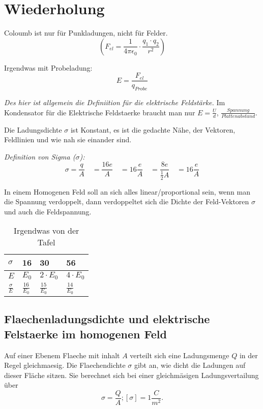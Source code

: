 \documentclass[a4paper]{report}
\begin{document}
\section{Wiederholung}

Coloumb ist nur f\"ur Punkladungen, nicht f\"ur Felder.
\[\left(F_{el}=\frac{1}{4\pi\epsilon_0}\cdot \frac{q_1\cdot q_2}{r^2}\right)\]

Irgendwas mit Probeladung: \[E=\frac{F_{el}}{q_{Probe}}\]

\textit{Des hier ist allgemein die Definiition f\"ur die elektrische Feldst\"arke.}
Im Kondensator f\"ur die Elektrische Feldstaerke braucht man nur
$E=\frac{U}{d}$, $\frac{Spannung}{Plattenabstand}$.


Die Ladungsdichte $\sigma$ ist Konstant, es ist die gedachte N\"ahe, der
Vektoren, Feldlinien und wie nah sie einander sind.

\textit{Definition von Sigma ($\sigma$):}
\[\sigma=\frac{q}{A} \quad =\frac{16e}{A} \quad = 16 \frac{e}{A} \quad = \frac{8e}{\frac{1}{2}A} \quad = 16 \frac{e}{A}\]

In einem Homogenen Feld soll an sich alles linear/proportional sein, wenn man
die Spannung verdoppelt, dann verdoppeltet sich die Dichte der Feld-Vektoren
$\sigma$ und auch die Feldspannung.

\begin{table}
  \caption{Irgendwas von der Tafel}
  \begin{center}
    \begin{tabular}[c]{l|l|l|l}
      \hline
      $\sigma$ & 16 & 30 & 56 \\
      \hline
      $E$ & $E_0$ & $2\cdot E_0$ & $4\cdot E_0$\\
      \hline
      $\frac{\sigma}{E}$ & $\frac{16}{E_0}$ & $\frac{15}{E_0}$ & $\frac{14}{E_0}$\\
    \end{tabular}
  \end{center}
\end{table}

\subsection{Flaechenladungsdichte und elektrische Felstaerke im homogenen Feld}

\begin{tcolorbox}[colback=red!10!white,colframe=red!75!black]
Auf einer Ebenem Flaeche mit inhalt $A$ verteilt sich eine Ladungsmenge $Q$ in
der Regel gleichmaesig. Die Flaechendichte $\sigma$ gibt an, wie dicht die
Ladungen auf dieser Fl\"ache sitzen. Sie berechnet sich bei einer
gleichm\"asigen Ladungsvertailung \"uber \[\sigma = \frac{Q}{A}; [\sigma]=1
\frac{C}{m^2}.\]
\end{tcolorbox}
\end{document}
